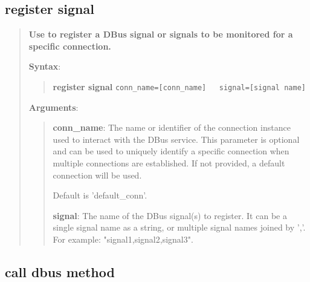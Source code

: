 \hypertarget{description-register-signal}{%
\subsection{\texorpdfstring{\textbf{register signal}}{register signal}}\label{description-register-signal}}
\begin{quote}
\textbf{Use to register a DBus signal or signals to be monitored for a specific connection.}

\textbf{Syntax}:
\begin{quote}
\textbf{register signal}
\texttt{conn\_name={[}conn\_name{]}\ \ \ signal={[}signal name{]}}
\end{quote}

\textbf{Arguments}:

\begin{quote}
\textbf{conn\_name}: The name or identifier of the connection instance used to interact with the DBus service.
  This parameter is optional and can be used to uniquely identify a specific connection
  when multiple connections are established. If not provided, a default connection will be used.

  Default is 'default\_conn'.

\vspace{\baselineskip}

\textbf{signal}: The name of the DBus signal(s) to register. It can be a single signal name as a string,
  or multiple signal names joined by ','. For example: "signal1,signal2,signal3".
\end{quote}
\end{quote}

\hypertarget{description-call-dbus-method}{%
\subsection{\texorpdfstring{\textbf{call dbus method}}{call dbus method}}\label{description-call-dbus-method}}

